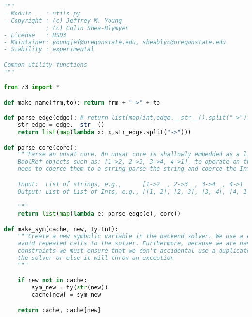 \newpage
\begin{lstlisting}[language=python]
"""
- Module    : utils.py
- Copyright : (c) Jeffrey M. Young
            ; (c) Colin Shea-Blymyer
- License   : BSD3
- Maintainer: youngjef@oregonstate.edu, sheablyc@oregonstate.edu
- Stability : experimental

Common utility functions
"""

from z3 import *

def make_name(frm,to): return frm + "->" + to

def parse_edge(edge): # return list(map(int,edge.__str__().split("->")))
    str_edge = edge.__str__()
    return list(map(lambda x: x,str_edge.split("->")))

def parse_core(core):
    """Parse an unsat core. An unsat core is shallowly embedded as a list of z3
    BoolRef objects such as: [1->2, 2->3, 3->4, 4->1], to operate on these we
    need to coerce them to a string parse the string and coerce the Ints out.

    Input:  List of strings, e.g.,      [1->2  , 2->3  , 3->4  , 4->1  ]
    Output: List of List of Ints, e.g., [[1, 2], [2, 3], [3, 4], [4, 1]]

    """
    return list(map(lambda e: parse_edge(e), core))

def make_sym(cache, new, ty=Int):
    """Create a new symbolic variable in the backend solver. We use a cache to
    avoid repeated calls to the solver. Furthermore, because we are naming
    constraints we must ensure that we don't accidental use a duplicate name in
    the solver or else it will throw an exception
    """

    if new not in cache:
        sym_new = ty(str(new))
        cache[new] = sym_new

    return cache, cache[new]
\end{lstlisting}